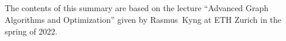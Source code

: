 
\begin{fullwidth}

\section*{}
The contents of this summary are based on the lecture ``Advanced Graph Algorithms and Optimization'' given by \mbox{Rasmus Kyng} at ETH Zurich in the spring of 2022.

\end{fullwidth}
\thispagestyle{empty}
\clearpage
